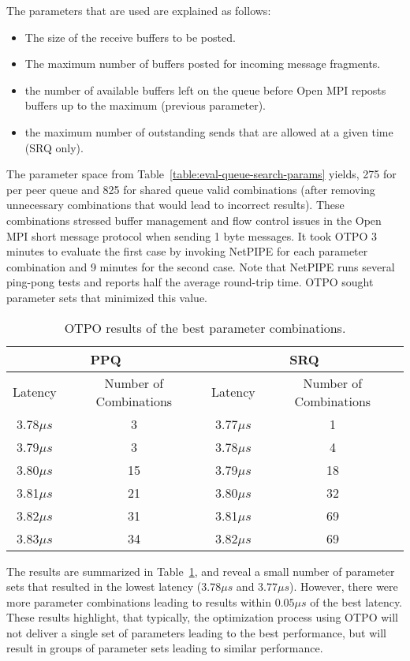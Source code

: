 The parameters that are used are explained as follows:\\
\begin{itemize}
\item The size of the receive buffers to be posted.
\item The maximum number of buffers posted for incoming message fragments.
\item the number of available buffers left on the queue before Open
  MPI reposts buffers up to the maximum (previous parameter).
\item the maximum number of outstanding sends that are allowed at a
  given time (SRQ only).
\end{itemize}

The parameter space from Table~\ref{table:eval-queue-search-params} yields,
275 for per peer queue and 825 for shared queue valid combinations (after
removing unnecessary combinations that would lead to incorrect
results). These combinations stressed buffer management and flow control
issues in the Open MPI short message protocol when sending 1 byte
messages. It took OTPO 3 minutes to evaluate the first
case by invoking NetPIPE for each parameter combination and 9 minutes for the second case.  
Note that NetPIPE runs several ping-pong tests and reports half the average round-trip time. OTPO sought parameter sets that minimized this value.

\begin{table}[tb]
\centering
\caption{OTPO results of the best parameter combinations.}
\label{table:results} 
\begin{tabular}{|c|c||c|c|} 
\hline
\multicolumn{2}{|c|}{PPQ} & \multicolumn{2}{|c|}{SRQ} \\
\hline
Latency & Number of Combinations & Latency & Number of Combinations\\
\hline
3.78$\mu s$  & 3& 3.77$\mu s$  & 1\\ 
\hline		  
3.79$\mu s$  & 3 & 3.78$\mu s$  & 4\\ 
\hline		  
3.80$\mu s$  & 15 & 3.79$\mu s$  & 18\\
\hline
3.81$\mu s$  & 21 & 3.80$\mu s$  & 32\\
\hline		  
3.82$\mu s$  & 31 &3.81$\mu s$  & 69\\
\hline		   
3.83$\mu s$  & 34 & 3.82$\mu s$  & 69\\
\hline
\end{tabular}  
\end{table}


The results are summarized in Table~\ref{table:results}, and reveal a small number of parameter sets that resulted in the lowest latency ($3.78\mu s$ and $3.77\mu s$). However, there were more parameter combinations leading to results within $0.05\mu s$ of the best latency.  These results highlight, that typically, the optimization process using OTPO will not deliver a single set of parameters leading to the best performance, but will result in groups of parameter sets leading to similar performance. %

